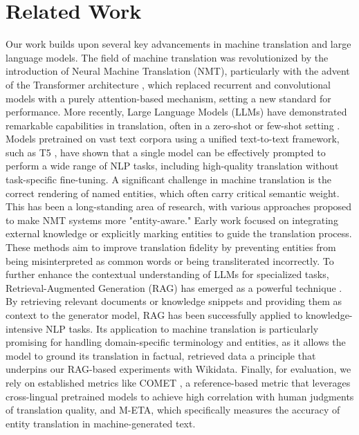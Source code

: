 \documentclass{ecai}
\begin{document}
\section{Related Work}
\label{sec:related}
Our work builds upon several key advancements in machine translation and large language models. 
The field of machine translation was revolutionized by the introduction of Neural Machine Translation (NMT), 
particularly with the advent of the Transformer architecture \cite{vaswani2017attention}, 
which replaced recurrent and convolutional models with a purely attention-based mechanism, 
setting a new standard for performance.
More recently, Large Language Models (LLMs) have demonstrated remarkable capabilities in translation, 
often in a zero-shot or few-shot setting \cite{brown2020language}. 
Models pretrained on vast text corpora using a unified text-to-text framework, 
such as T5 \cite{raffel2020exploring}, have shown that a single model can be effectively prompted 
to perform a wide range of NLP tasks, including high-quality translation without task-specific fine-tuning.
A significant challenge in machine translation is the correct rendering of named entities,
which often carry critical semantic weight. This has been a long-standing area of research, 
with various approaches proposed to make NMT systems more "entity-aware." 
Early work focused on integrating external knowledge or explicitly marking entities to guide the translation process. 
These methods aim to improve translation fidelity by preventing entities from being misinterpreted 
as common words or being transliterated incorrectly.
To further enhance the contextual understanding of LLMs for specialized tasks, 
Retrieval-Augmented Generation (RAG) has emerged as a powerful technique \cite{lewis2020retrieval}. 
By retrieving relevant documents or knowledge snippets and providing them as context to the generator model, 
RAG has been successfully applied to knowledge-intensive NLP tasks. Its application to machine translation is 
particularly promising for handling domain-specific terminology and entities, 
as it allows the model to ground its translation in factual, retrieved data
a principle that underpins our RAG-based experiments with Wikidata. 
Finally, for evaluation, we rely on established metrics like COMET \cite{rei-etal-2020-comet}, 
a reference-based metric that leverages cross-lingual pretrained models to achieve high correlation
with human judgments of translation quality, and M-ETA,
which specifically measures the accuracy of entity translation in machine-generated text.
\end{document}
